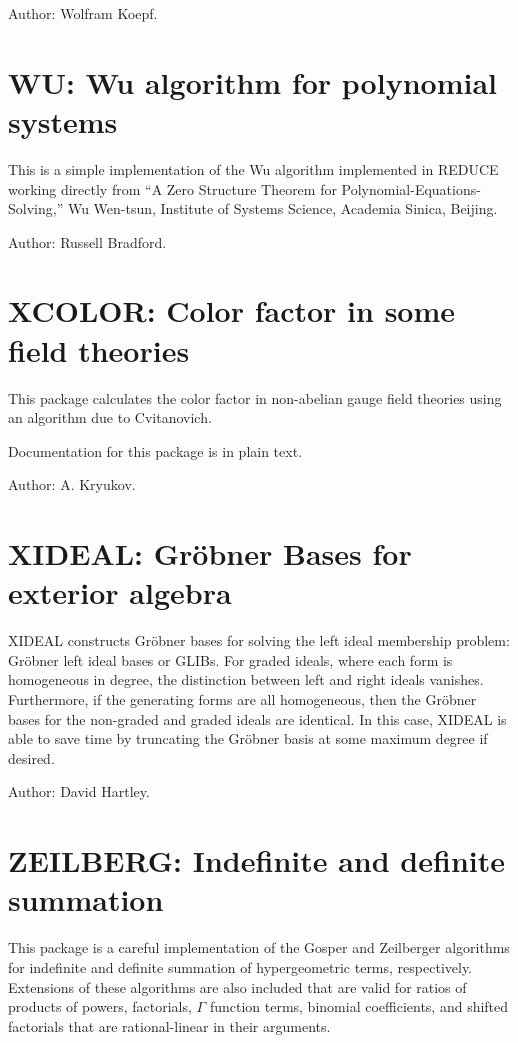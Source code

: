 Author: Wolfram Koepf.

\section{WU: Wu algorithm for polynomial systems} 

This is a simple implementation of the Wu algorithm implemented in REDUCE
working directly from ``A Zero Structure Theorem for
Polynomial-Equations-Solving,'' Wu Wen-tsun, Institute of Systems Science,
Academia Sinica, Beijing.

Author: Russell Bradford.

\section{XCOLOR: Color factor in some field theories}

This package calculates the color factor in non-abelian gauge field
theories using an algorithm due to Cvitanovich.

Documentation for this package is in plain text.

Author: A. Kryukov.

\section{XIDEAL: Gr\"obner Bases for exterior algebra} 

XIDEAL constructs Gr\"obner bases for solving the left ideal membership
problem: Gr\"obner left ideal bases or GLIBs. For graded ideals, where each
form is homogeneous in degree, the distinction between left and right
ideals vanishes. Furthermore, if the generating forms are all homogeneous,
then the Gr\"obner bases for the non-graded and graded ideals are
identical. In this case, XIDEAL is able to save time by truncating the
Gr\"obner basis at some maximum degree if desired.

Author: David Hartley.

\section{ZEILBERG: Indefinite and definite summation}

This package is a careful implementation of the Gosper and Zeilberger
algorithms for indefinite and definite summation of hypergeometric terms,
respectively.  Extensions of these algorithms are also included that are
valid for ratios of products of powers, factorials, $\Gamma$ function
terms, binomial coefficients, and shifted factorials that are
rational-linear in their arguments.

